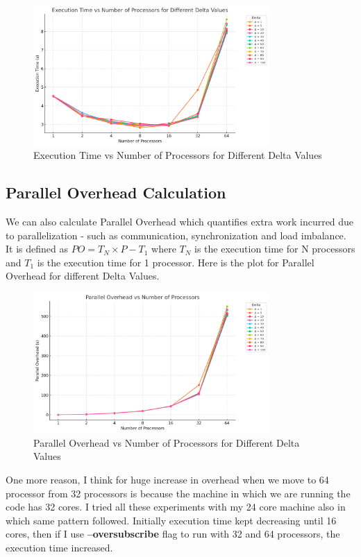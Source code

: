 \documentclass{article}
\begin{document}
\begin{figure}[h]
    \centering
    \includegraphics[width=0.8\textwidth]{executionTime.png}
    \caption{Execution Time vs Number of Processors for Different Delta Values}
    \label{fig:efficiency}
\end{figure}

\newpage

\subsection*{Parallel Overhead Calculation}
We can also calculate Parallel Overhead which quantifies extra work incurred due to parallelization - such as communication, synchronization and load imbalance. It is defined as $PO = T_N \times P - T_1$ where $T_N$ is the execution time for N processors and $T_1$ is the execution time for 1 processor. Here is the plot for Parallel Overhead for different Delta Values.

\begin{figure}[h]
    \centering
    \includegraphics[width=0.8\textwidth]{overhead.png}
    \caption{Parallel Overhead vs Number of Processors for Different Delta Values}
    \label{fig:parallelOverhead}
\end{figure}

One more reason, I think for huge increase in overhead when we move to 64 processor from 32 processors is because the machine in which we are running the code has 32 cores. I tried all these experiments with my 24 core machine also in which same pattern followed. Initially execution time kept decreasing until 16 cores, then if I use \textbf{--oversubscribe} flag to run with 32 and 64 processors, the execution time increased. 
\end{document}
